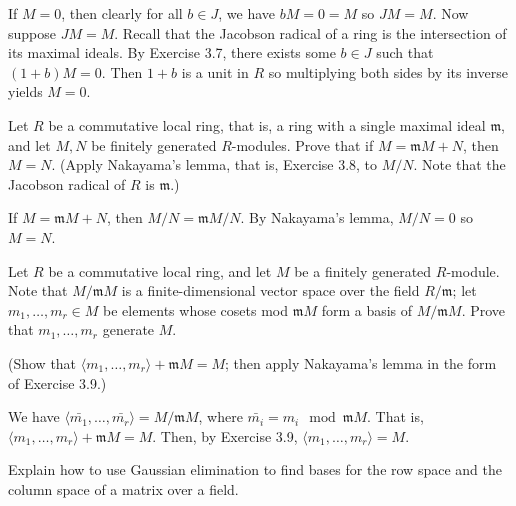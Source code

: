 \documentclass[../../master.tex]{subfiles}
\begin{document}
\begin{solution}
    If $M = 0$, then clearly for all $b \in J$, we have $bM = 0 = M$ so $JM = M$.
    Now suppose $JM = M$.
    Recall that the Jacobson radical of a ring is the intersection of its maximal ideals.
    By Exercise 3.7, there exists some $b \in J$ such that $(1 + b)M = 0$.
    Then $1 + b$ is a unit in $R$ so multiplying both sides by its inverse yields $M = 0$.
\end{solution}

\begin{problem}
    Let $R$ be a commutative local ring, that is, a ring with a single maximal ideal $\mathfrak{m}$, and let $M, N$ be finitely generated $R$-modules.
    Prove that if $M = \mathfrak{m} M + N$, then $M = N$.
    (Apply Nakayama's lemma, that is, Exercise 3.8, to $M / N$.
    Note that the Jacobson radical of $R$ is $\mathfrak{m}$.)
\end{problem}

\begin{solution}
    If $M = \mathfrak{m}M + N$, then $M / N = \mathfrak{m} M / N$.
    By Nakayama's lemma, $M / N = 0$ so $M = N$.
\end{solution}

\begin{problem}
    Let $R$ be a commutative local ring, and let $M$ be a finitely generated $R$-module.
    Note that $M / \mathfrak{m}M$ is a finite-dimensional vector space over the field $R / \mathfrak{m}$;
    let $m_1, \ldots, m_r \in M$ be elements whose cosets mod $\mathfrak{m}M$ form a basis of $M / \mathfrak{m}M$.
    Prove that $m_1, \ldots, m_r$ generate $M$.

    (Show that $\langle m_1, \ldots, m_r \rangle + \mathfrak{m} M = M$;
    then apply Nakayama's lemma in the form of Exercise 3.9.)
\end{problem}

\begin{solution}
    We have $\langle \bar{m_1}, \ldots, \bar{m_r} \rangle = M / \mathfrak{m}M$, where $\bar{m_i} = m_i \mod \mathfrak{m}M$.
    That is, $\langle m_1, \ldots, m_r \rangle + \mathfrak{m}M = M$.
    Then, by Exercise 3.9, $\langle m_1, \ldots, m_r \rangle = M$.
\end{solution}

\begin{problem}
    Explain how to use Gaussian elimination to find bases for the row space and the column space of a matrix over a field.
\end{problem}
\end{document}

